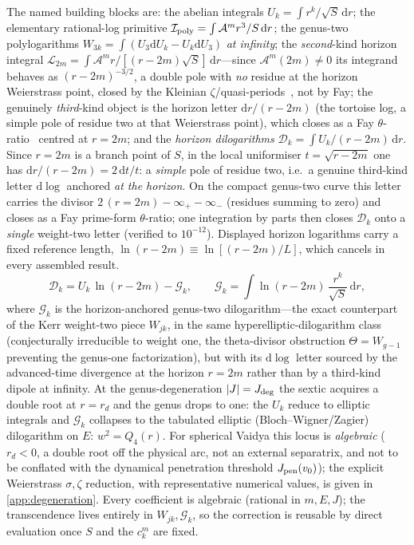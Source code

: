 \documentclass[12pt]{iopart}
\newcommand{\Jpen}{J_{\rm pen}}
\newcommand{\dd}{\mathrm{d}}
\theoremstyle{plain}
\theoremstyle{definition}
\theoremstyle{plain}
\theoremstyle{remark}
\begin{document}
The named building blocks are: the abelian integrals $U_k=\int r^k/\sqrt S\,\dd r$;
the elementary rational-log primitive
$\mathcal{I}_{\rm poly}=\int\mathcal{A}^m r^3/S\,\dd r$; the genus-two
polylogarithms $W_{3k}=\int(U_3\dd U_k-U_k\dd U_3)$ \emph{at infinity};
the \emph{second}-kind horizon integral
$\mathcal{L}_{2m}=\int\mathcal{A}^m r/[(r-2m)\sqrt S]\,\dd r$---since
$\mathcal{A}^m(2m)\ne0$ its integrand behaves as $(r-2m)^{-3/2}$, a double pole with
\emph{no} residue at the horizon Weierstrass point, closed by the Kleinian
$\zeta$/quasi-periods~\cite{BuchstaberEnolskii1997,BakerAbelian1897}, not by Fay; the
genuinely \emph{third}-kind object is the horizon letter $\dd r/(r-2m)$ (the tortoise
log, a simple pole of residue two at that Weierstrass point), which closes as a Fay
$\theta$-ratio~\cite{Fay1973} centred at $r=2m$; and
the \emph{horizon dilogarithms} $\mathcal{D}_k=\int U_k/(r-2m)\,\dd r$. Since $r=2m$
is a branch point of $S$, in the local uniformiser $t=\sqrt{r-2m}$ one has
$\dd r/(r-2m)=2\,\dd t/t$: a \emph{simple} pole of residue two, i.e.\ a genuine
third-kind letter $\dd\log$ anchored \emph{at the horizon}. On the compact
genus-two curve this letter carries the divisor $2\,(r{=}2m)-\infty_+-\infty_-$ (residues
summing to zero) and closes as a Fay prime-form $\theta$-ratio; one integration by parts
then closes $\mathcal{D}_k$ onto a \emph{single} weight-two letter (verified to
$10^{-12}$). Displayed horizon logarithms carry a fixed reference length,
$\ln(r-2m)\equiv\ln[(r-2m)/L]$, which cancels in every assembled result.
\begin{equation}
    \mathcal{D}_k=U_k\,\ln(r-2m)-\mathcal{G}_k,\qquad
    \mathcal{G}_k=\int\ln(r-2m)\,\frac{r^k}{\sqrt S}\,\dd r,
    \label{eq:horizon-dilog}
\end{equation}
where $\mathcal{G}_k$ is the horizon-anchored genus-two dilogarithm---the exact
counterpart of the Kerr weight-two piece $W_{jk}$, in the same
hyperelliptic-dilogarithm class (conjecturally irreducible to weight one, the
theta-divisor obstruction $\Theta=W_{g-1}$ preventing the genus-one factorization),
but with its $\dd\log$ letter sourced by the
advanced-time divergence at the horizon $r=2m$ rather than by a third-kind dipole at
infinity. At the genus-degeneration $|J|=J_{\rm deg}$ the sextic acquires a double root at $r=r_d$
and the genus drops to one: the $U_k$ reduce to elliptic integrals and $\mathcal{G}_k$
collapses to the tabulated elliptic (Bloch--Wigner/Zagier) dilogarithm
\cite{Bloch2000,Zagier1990} on $E:\,w^2=Q_4(r)$. For spherical Vaidya this locus is
\emph{algebraic} ($r_d<0$, a double root off the physical arc, not an external
separatrix, and not to be conflated with the dynamical penetration threshold
$\Jpen(v_0)$); the explicit Weierstrass $\sigma,\zeta$ reduction, with representative
numerical values, is given in \ref{app:degeneration}. Every coefficient is algebraic
(rational in $m,E,J$); the transcendence lives entirely in $W_{jk},\mathcal{G}_k$, so the
correction is reusable by direct evaluation once $S$ and the $c_k^m$ are fixed.
\end{document}
